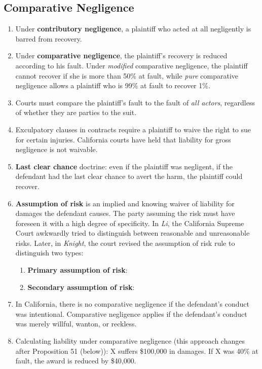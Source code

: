 \subsection{Comparative Negligence}

\begin{enumerate}
    \item Under \textbf{contributory negligence}, a plaintiff who acted at all 
    negligently is barred from recovery.
    \item Under \textbf{comparative negligence}, the plaintiff's recovery is 
    reduced according to his fault. Under \emph{modified} comparative 
    negligence, the plaintiff cannot recover if she is more than 50\% at 
    fault, while \emph{pure} comparative negligence allows a plaintiff who is 
    99\% at fault to recover 1\%.
    \item Courts must compare the plaintiff's fault to the fault of \emph{all 
    actors}, regardless of whether they are parties to the suit.
    \item Exculpatory clauses in contracts require a plaintiff to waive the 
    right to sue for certain injuries. California courts have held that 
    liability for gross negligence is not waivable.
    \item \textbf{Last clear chance} doctrine: even if the plaintiff was 
    negligent, if the defendant had the last clear chance to avert the harm, 
    the plaintiff could recover.
    \item \textbf{Assumption of risk} is an implied and knowing waiver of 
    liability for damages the defendant causes. The party assuming the risk 
    must have foreseen it with a high degree of specificity. In \emph{Li}, the 
    California Supreme Court awkwardly tried to distinguish between reasonable 
    and unreasonable risks. Later, in \emph{Knight}, the court revised the 
    assumption of risk rule to distinguish two types:
    \begin{enumerate}
        \item \textbf{Primary assumption of risk}: %
        \item \textbf{Secondary assumption of risk}: %
    \end{enumerate}
    \item In California, there is no comparative negligence if the defendant's 
    conduct was intentional. Comparative negligence applies if the defendant's 
    conduct was merely willful, wanton, or reckless.
    \item Calculating liability under comparative negligence (this approach 
    changes after Proposition 51 (below)): X suffers \$100,000 in damages. If X 
    was 40\% at fault, the award is reduced by \$40,000.
\end{enumerate}

